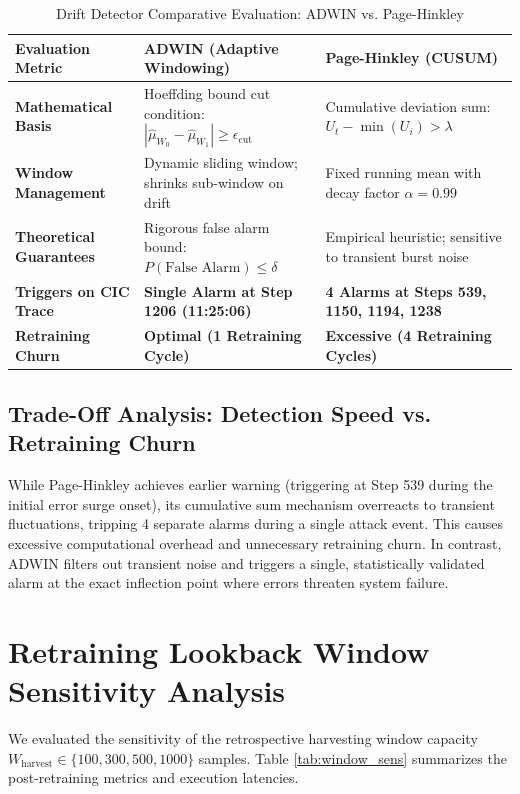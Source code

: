 \documentclass[12pt,a4paper,oneside]{report}
\begin{document}
\begin{table}[H]
\caption{Drift Detector Comparative Evaluation: ADWIN vs. Page-Hinkley}
\centering
\begin{tabularx}{\textwidth}{l p{6.5cm} p{6.5cm}}
\toprule
\textbf{Evaluation Metric} & \textbf{ADWIN (Adaptive Windowing)} & \textbf{Page-Hinkley (CUSUM)} \\
\midrule
\textbf{Mathematical Basis} & Hoeffding bound cut condition: $|\hat{\mu}_{W_0} - \hat{\mu}_{W_1}| \ge \epsilon_{\text{cut}}$ & Cumulative deviation sum: $U_t - \min(U_i) > \lambda$ \\
\addlinespace
\textbf{Window Management} & Dynamic sliding window; shrinks sub-window on drift & Fixed running mean with decay factor $\alpha = 0.99$ \\
\addlinespace
\textbf{Theoretical Guarantees} & Rigorous false alarm bound: $P(\text{False Alarm}) \le \delta$ & Empirical heuristic; sensitive to transient burst noise \\
\addlinespace
\textbf{Triggers on CIC Trace} & \textbf{Single Alarm at Step 1206 (11:25:06)} & \textbf{4 Alarms at Steps 539, 1150, 1194, 1238} \\
\addlinespace
\textbf{Retraining Churn} & \textbf{Optimal (1 Retraining Cycle)} & \textbf{Excessive (4 Retraining Cycles)} \\
\bottomrule
\end{tabularx}
\label{tab:detector_comp}
\end{table}

\subsection{Trade-Off Analysis: Detection Speed vs. Retraining Churn}
While Page-Hinkley achieves earlier warning (triggering at Step 539 during the initial error surge onset), its cumulative sum mechanism overreacts to transient fluctuations, tripping 4 separate alarms during a single attack event. This causes excessive computational overhead and unnecessary retraining churn. In contrast, ADWIN filters out transient noise and triggers a single, statistically validated alarm at the exact inflection point where errors threaten system failure.

\section{Retraining Lookback Window Sensitivity Analysis}
We evaluated the sensitivity of the retrospective harvesting window capacity $W_{\text{harvest}} \in \{100, 300, 500, 1000\}$ samples. Table \ref{tab:window_sens} summarizes the post-retraining metrics and execution latencies.
\end{document}

